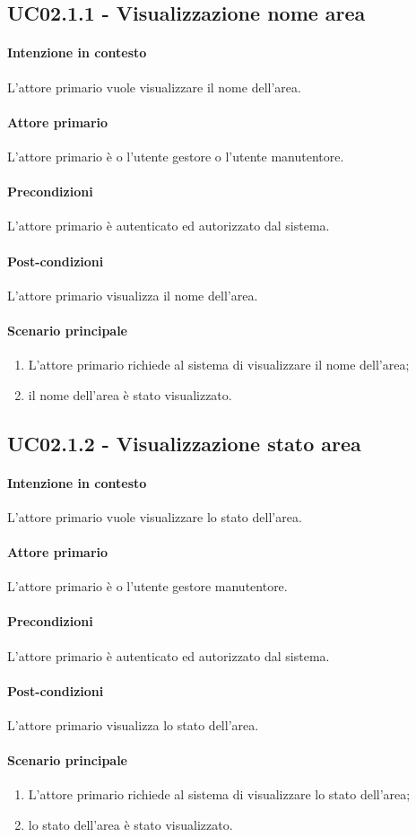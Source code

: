 \subsection{UC02.1.1 - Visualizzazione nome area}\label{uc:02.1.1}

\paragraph{Intenzione in contesto} L'attore primario vuole visualizzare il nome dell'area.
\paragraph{Attore primario} L'attore primario è o l'utente gestore o l'utente manutentore.
\paragraph{Precondizioni} L'attore primario è autenticato ed autorizzato dal sistema.
\paragraph{Post-condizioni} L'attore primario visualizza il nome dell'area.
\paragraph{Scenario principale}
\begin{enumerate}
    \item L'attore primario richiede al sistema di visualizzare il nome dell'area;
    \item il nome dell'area è stato visualizzato.
\end{enumerate}

\subsection{UC02.1.2 - Visualizzazione stato area}\label{uc:02.1.2}

\paragraph{Intenzione in contesto} L'attore primario vuole visualizzare lo stato dell'area.
\paragraph{Attore primario} L'attore primario è o l'utente gestore manutentore.
\paragraph{Precondizioni} L'attore primario è autenticato ed autorizzato dal sistema.
\paragraph{Post-condizioni} L'attore primario visualizza lo stato dell'area.
\paragraph{Scenario principale}
\begin{enumerate}
    \item L'attore primario richiede al sistema di visualizzare lo stato dell'area;
    \item lo stato dell'area è stato visualizzato.
\end{enumerate}